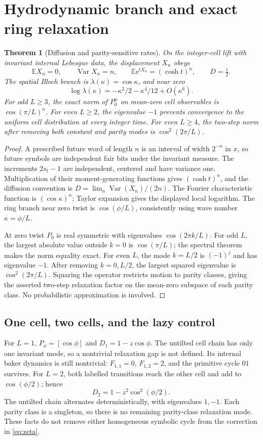 \documentclass[10pt]{article}
\newtheorem{theorem}{Theorem}
\newcommand{\ee}{\mathrm e}
\begin{document}
\section{Hydrodynamic branch and exact ring relaxation}
\begin{theorem}[Diffusion and parity-sensitive rates]\label{thm:diffusion}
On the integer-cell lift with invariant internal Lebesgue data, the
displacement $X_n$ obeys
\[
\mathbb E X_n=0,\qquad \operatorname{Var}X_n=n,\qquad
\mathbb E\ee^{tX_n}=(\cosh t)^n,\qquad D=\tfrac12.
\]
The spatial Bloch branch is $\lambda(\kappa)=\cos\kappa$, and near zero
\[
\log\lambda(\kappa)=-\kappa^2/2-\kappa^4/12+O(\kappa^6).
\]
For odd $L\geq3$, the exact norm of $P_0^n$ on mean-zero cell observables is
$\cos(\pi/L)^n$. For even $L\geq2$, the eigenvalue $-1$ prevents convergence
to the uniform cell distribution at every integer time. For even $L\geq4$,
the two-step norm after removing both constant and parity modes is
$\cos^2(2\pi/L)$.
\end{theorem}
\begin{proof}
A prescribed future word of length $n$ is an interval of width $2^{-n}$ in
$x$, so future symbols are independent fair bits under the invariant measure.
The increments $2s_t-1$ are independent, centered and have variance one.
Multiplication of their moment-generating functions gives $(\cosh t)^n$,
and the diffusion convention is $D=\lim_n\operatorname{Var}(X_n)/(2n)$.
The Fourier characteristic function is $(\cos\kappa)^n$; Taylor expansion
gives the displayed local logarithm. The ring branch near zero twist is
$\cos(\phi/L)$, consistently using wave number $\kappa=\phi/L$.

At zero twist $P_0$ is real symmetric with eigenvalues
$\cos(2\pi k/L)$. For odd $L$, the largest absolute value outside $k=0$ is
$\cos(\pi/L)$; the spectral theorem makes the norm equality exact. For even
$L$, the mode $k=L/2$ is $(-1)^j$ and has eigenvalue $-1$. After removing
$k=0,L/2$, the largest squared eigenvalue is $\cos^2(2\pi/L)$. Squaring the
operator restricts motion to parity classes, giving the asserted two-step
relaxation factor on the mean-zero subspace of each parity class. No
probabilistic approximation is involved.
\end{proof}

\subsection{One cell, two cells, and the lazy control}
For $L=1$, $P_\phi=[\cos\phi]$ and $D_1=1-z\cos\phi$. The untilted cell
chain has only one invariant mode, so a nontrivial relaxation gap is not
defined. Its internal baker dynamics is still nontrivial: $F_{1,1}=0$,
$F_{1,2}=2$, and the primitive cycle $01$ survives.
For $L=2$, both labelled transitions reach the other cell and add to
$\cos(\phi/2)$; hence
\[
D_2=1-z^2\cos^2(\phi/2).
\]
The untilted chain alternates deterministically, with eigenvalues $1,-1$.
Each parity class is a singleton, so there is no remaining parity-class
relaxation mode. These facts do not remove either homogeneous symbolic cycle
from the correction in \eqref{eq:zeta}.
\end{document}

